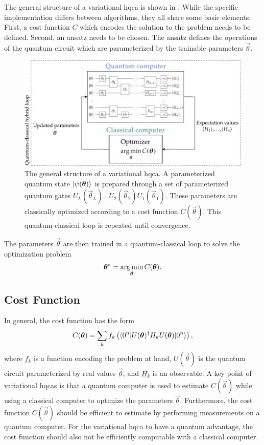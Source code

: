 The general structure of a variational \gls{hqca} is shown in .
While the specific implementation differs between algorithms, they all share some basic elements.
First, a cost function $C$ which encodes the solution to the problem needs to be defined.
Second, an ansatz needs to be chosen.
The ansatz defines the operations of the quantum circuit which are parameterized by the trainable parameters $\vec{\theta}$.
\begin{figure}[ht]
    \centering
    \includegraphics[width=1\linewidth]{figures/vqa-general-structure.pdf}
    \caption[The general structure of a variational \acrshort{hqca}.]{
        The general structure of a variational \gls{hqca}.
        A parameterized quantum state $\vert{\psi(\bm{\theta})}\rangle$ is prepared through a set of parameterized quantum gates $U_L(\vec{\theta}_L) \ldots U_2(\vec{\theta}_2)U_1(\vec{\theta}_1)$.
        These parameters are classically optimized according to a cost function $C(\vec{\theta})$.
        This quantum-classical loop is repeated until convergence.
    }
    \label{fig:vqa-general-structure}
\end{figure}
The parameters $\vec{\theta}$ are then trained in a quantum-classical loop to solve the optimization problem
\begin{equation} \label{eqn:optimization-problem}
\bm{\theta}^* = \operatorname*{arg\,min}_{\bm{\theta}} C(\bm{\theta}).
\end{equation}

\subsection{Cost Function}
In general, the cost function has the form
\begin{equation} \label{eqn:general-cost-function}
C(\bm{\theta}) = \sum_k f_k\left(\langle{0^n}\vert U(\bm{\theta})^\dagger H_k U(\bm{\theta})\vert{0^n}\rangle\right),
\end{equation}
where $f_k$ is a function encoding the problem at hand, $U(\vec{\theta})$ is the quantum circuit parameterized by real values $\vec{\theta}$, and $H_k$ is an observable.
A key point of variational \glspl{hqca} is that a quantum computer is used to estimate $C(\vec{\theta})$ while using a classical computer to optimize the parameters $\vec{\theta}$.
Furthermore, the cost function $C(\vec{\theta})$ should be efficient to estimate by performing measurements on a quantum computer.
For the variational \gls{hqca} to have a quantum advantage, the cost function should also not be efficiently computable with a classical computer.


